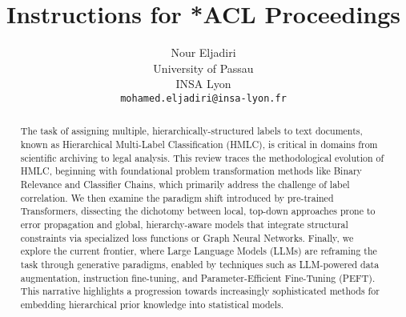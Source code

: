 \documentclass[12pt]{article}
\title{Instructions for *ACL Proceedings}
\author{Nour Eljadiri \\
  University of Passau \\
  INSA Lyon \\
  \texttt{mohamed.eljadiri@insa-lyon.fr} \\
}
\begin{document}
\maketitle

\begin{abstract}
    The task of assigning multiple, hierarchically-structured labels to text documents, known as Hierarchical Multi-Label Classification (HMLC), is critical in domains from scientific archiving to legal analysis. This review traces the methodological evolution of HMLC, beginning with foundational problem transformation methods like Binary Relevance and Classifier Chains, which primarily address the challenge of label correlation. We then examine the paradigm shift introduced by pre-trained Transformers, dissecting the dichotomy between local, top-down approaches prone to error propagation and global, hierarchy-aware models that integrate structural constraints via specialized loss functions or Graph Neural Networks. Finally, we explore the current frontier, where Large Language Models (LLMs) are reframing the task through generative paradigms, enabled by techniques such as LLM-powered data augmentation, instruction fine-tuning, and Parameter-Efficient Fine-Tuning (PEFT). This narrative highlights a progression towards increasingly sophisticated methods for embedding hierarchical prior knowledge into statistical models.
\end{abstract}













\end{document}
